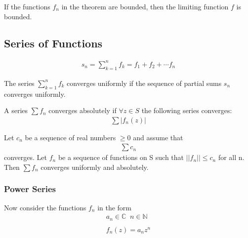 \begin{thm}
  If the functions $f_n$ in the theorem are bounded, then the limiting function $f$ is bounded.
\end{thm}

\subsection{Series of Functions}

\begin{defn}
  \begin{align*}
    s_n = \sum_{k = 1}^{n} f_k = f_1 + f_2 + \cdots f_n
  \end{align*}
\end{defn}

\begin{defn}
  The series $\sum_{k = 1}^{n} f_k$ converges uniformly if the sequence of partial 
  sums $s_n$ converges uniformly.
\end{defn}

\begin{defn}
  A series $\sum f_n$ converges absolutely if $\forall z \in S$ the following series converges:
  \begin{align*}
    \sum | f_n (z) |
  \end{align*}
\end{defn}

\begin{thm}
  Let $c_n$ be a sequence of real numbers $\geq 0$ and assume that
  \begin{align*}
    \sum c_n
  \end{align*}
  converges. Let $f_n$ be a sequence of functions on S such that 
  $||f_n|| \leq c_n$ for all n. Then $\sum f_n$ converges uniformly and absolutely.
\end{thm}

\subsubsection*{Power Series}

Now consider the functions $f_n$ in the form
\begin{align*}
  a_n \in \mathbb{C} \;\; n \in \mathbb{N} \\
  \\
  f_n (z) = a_n z^n \\ 
\end{align*}

